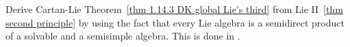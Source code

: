 
Derive Cartan-Lie Theorem~\ref{thm 1.14.3 DK global Lie's third} from Lie II~\ref{thm second principle} by using the fact that every Lie algebra is a semidirect product of a solvable and a semisimple algebra. This is done in \cite[Rem.~9.5.12]{HN}.


